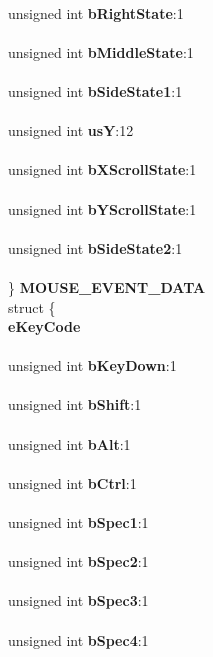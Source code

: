 \begin{DoxyCompactItemize}
\begin{tabbing}
\>\>\\
\>\>unsigned int {\bf bRightState}:1\\
\>\>\\
\>\>unsigned int {\bf bMiddleState}:1\\
\>\>\\
\>\>unsigned int {\bf bSideState1}:1\\
\>\>\\
\>\>unsigned int {\bf usY}:12\\
\>\>\\
\>\>unsigned int {\bf bXScrollState}:1\\
\>\>\\
\>\>unsigned int {\bf bYScrollState}:1\\
\>\>\\
\>\>unsigned int {\bf bSideState2}:1\\
\>\>\\
\>\} {\bf MOUSE\_EVENT\_DATA}\\
\>struct \{\\
\> {\bf eKeyCode}\\
\>\>\\
\>\>unsigned int {\bf bKeyDown}:1\\
\>\>\\
\>\>unsigned int {\bf bShift}:1\\
\>\>\\
\>\>unsigned int {\bf bAlt}:1\\
\>\>\\
\>\>unsigned int {\bf bCtrl}:1\\
\>\>\\
\>\>unsigned int {\bf bSpec1}:1\\
\>\>\\
\>\>unsigned int {\bf bSpec2}:1\\
\>\>\\
\>\>unsigned int {\bf bSpec3}:1\\
\>\>\\
\>\>unsigned int {\bf bSpec4}:1\\
\>\>\\

\end{tabbing}
\end{DoxyCompactItemize}

